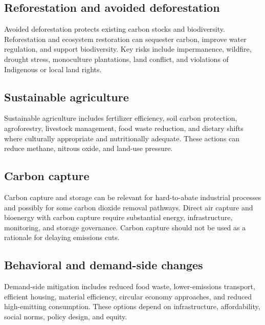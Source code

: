 \documentclass[12pt]{article}
\begin{document}
\subsection{Reforestation and avoided deforestation}

Avoided deforestation protects existing carbon stocks and biodiversity. Reforestation and ecosystem restoration can sequester carbon, improve water regulation, and support biodiversity. Key risks include impermanence, wildfire, drought stress, monoculture plantations, land conflict, and violations of Indigenous or local land rights.

\subsection{Sustainable agriculture}

Sustainable agriculture includes fertilizer efficiency, soil carbon protection, agroforestry, livestock management, food waste reduction, and dietary shifts where culturally appropriate and nutritionally adequate. These actions can reduce methane, nitrous oxide, and land-use pressure.

\subsection{Carbon capture}

Carbon capture and storage can be relevant for hard-to-abate industrial processes and possibly for some carbon dioxide removal pathways. Direct air capture and bioenergy with carbon capture require substantial energy, infrastructure, monitoring, and storage governance. Carbon capture should not be used as a rationale for delaying emissions cuts.

\subsection{Behavioral and demand-side changes}

Demand-side mitigation includes reduced food waste, lower-emissions transport, efficient housing, material efficiency, circular economy approaches, and reduced high-emitting consumption. These options depend on infrastructure, affordability, social norms, policy design, and equity.
\end{document}
